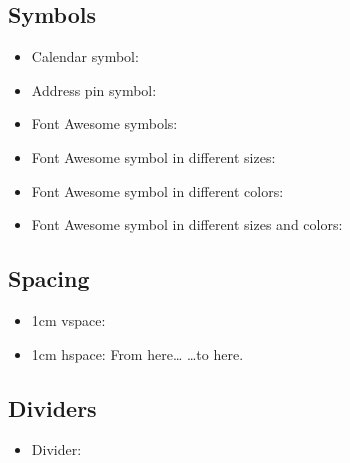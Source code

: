 \documentclass[11pt,letterpaper,sans]{moderncv}
\newcommand{\divider}{\textcolor{color2!30}{\hdashrule{\linewidth}{0.6pt}{0.5ex}}\medskip}
\renewcommand*{\addresssymbol}{{\color{color2}\small\faMapMarker}~}
\newcommand{\calendarsymbol}{{\color{color2}\small\faCalendar}~}
\begin{document}
\subsection{Symbols}
\label{sec:org2b31976}
\begin{itemize}
\item Calendar symbol: \calendarsymbol
\item Address pin symbol: \addresssymbol
\item Font Awesome symbols: {\faCogs} {\faGraduationCap} {\faGraduationCap} {\faBook} {\faWrench} {\faTrophy} {\faChalkboardTeacher} {\faUsers}
\item Font Awesome symbol in different sizes: {\Huge\faBriefcase} {\huge\faBriefcase} {\Large\faBriefcase} {\large\faBriefcase} {\normalsize\faBriefcase} {\small\faBriefcase} {\footnotesize\faBriefcase} {\scriptsize\faBriefcase} {\tiny\faBriefcase}
\item Font Awesome symbol in different colors: {\color{color1}\faBriefcase} {\color{black}\faBriefcase} {\color{red}\faBriefcase} {\color{darkgrey}\faBriefcase} {\color{orange}\faBriefcase} {\color{burgundy}\faBriefcase} {\color{purple}\faBriefcase} {\color{lightblue}\faBriefcase} {\color{green}\faBriefcase}
\item Font Awesome symbol in different sizes and colors: {\color{color1}\Huge\faBriefcase} {\color{black}\huge\faBriefcase} {\color{red}\Large\faBriefcase} {\color{darkgrey}\large\faBriefcase} {\color{orange}\normalsize\faBriefcase} {\color{burgundy}\small\faBriefcase} {\color{purple}\footnotesize\faBriefcase} {\color{lightblue}\scriptsize\faBriefcase} {\color{green}\tiny\faBriefcase}
\end{itemize}


\subsection{Spacing}
\label{sec:org0081da3}
\begin{itemize}
\item 1cm vspace:
\end{itemize}

\vspace{1cm}

\begin{itemize}
\item 1cm hspace: From here\ldots{} \hspace{1cm} \ldots{}to here.
\end{itemize}


\subsection{Dividers}
\label{sec:org94ea7b3}
\begin{itemize}
\item Divider:
\end{itemize}
\divider
\end{document}
